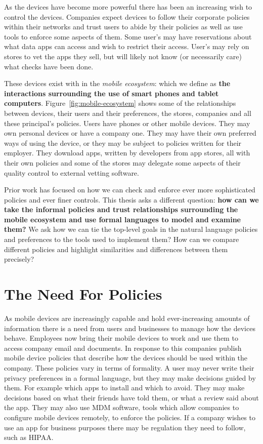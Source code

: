 \documentclass[thesis.tex]{subfiles}
\begin{document}
As the devices have become more powerful there has been an increasing wish to
control the devices. Companies expect devices to follow their corporate policies
within their networks and trust users to abide by their policies as well as use
tools to enforce some aspects of them. Some user's may have reservations about
what data apps can access and wish to restrict their access. User's may rely on
stores to vet the apps they sell, but will likely not know (or necessarily care)
what checks have been done.

These devices exist with in the \emph{mobile ecosystem}: which we define as
\textbf{the interactions surrounding the use of smart phones and tablet
computers}. Figure~\ref{fig:mobile-ecosystem} shows some of the relationships
between devices, their users and their preferences, the stores, companies and
all these principal's policies. Users have phones or other mobile devices. They
may own personal devices or have a company one. They may have their own
preferred ways of using the device, or they may be subject to policies written
for their employer. They download apps, written by developers from app stores,
all with their own policies and some of the stores may delegate some aspects of
their quality control to external vetting software.

Prior work has focused on how we can check and enforce ever more sophisticated
policies and ever finer controls. This thesis asks a different question:
\textbf{how can we take the informal policies and trust relationships
surrounding the mobile ecosystem and use formal languages to model and examine
them?} We ask how we can tie the top-level goals in the natural language
policies and preferences to the tools used to implement them? How can we compare
different policies and highlight similarities and differences between them
precisely?

\section{The Need For Policies}

As mobile devices are increasingly capable and hold ever-increasing amounts of
information there is a need from users and businesses to manage how the devices
behave. Employees now bring their mobile devices to work and use them to access
company email and documents. In response to this companies publish mobile device
policies that describe how the devices should be used within the company. These
policies vary in terms of formality. A user may never write their privacy
preferences in a formal language, but they may make decisions guided by them.
For example which apps to install and which to avoid. They may make decisions
based on what their friends have told them, or what a review said about the app.
They may also use \ac{MDM} software, tools which allow companies to configure
mobile devices remotely, to enforce the policies. If a company wishes to use an
app for business purposes there may be regulation they need to follow, such as
\ac{HIPAA}.
\end{document}
